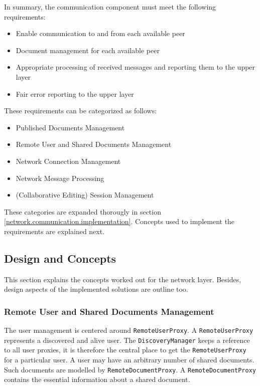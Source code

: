 In summary, the communication component must meet the following requirements:

\begin{itemize}
 \item Enable communication to and from each available peer
 \item Document management for each available peer
 \item Appropriate processing of received messages and reporting them to the upper layer
 \item Fair error reporting to the upper layer
\end{itemize}

These requirements can be categorized as follows:

\begin{itemize}
 \item Published Documents Management
 \item Remote User and Shared Documents Management
 \item Network Connection Management
 \item Network Message Processing
 \item (Collaborative Editing) Session Management
\end{itemize}

These categories are expanded thorougly in section \ref{network.communication.implementation}. Concepts used to implement the requirements are explained next.

\subsection{Design and Concepts}
This section explains the concepts worked out for the network layer. Besides, design aspects of the implemented solutions are outline too.

\subsubsection{Remote User and Shared Documents Management}
The user management is centered around \texttt{RemoteUserProxy}. A  \texttt{Remote\-User\-Proxy} represents a discovered and alive user. The  \texttt{DiscoveryManager} keeps a reference to all user proxies, it is therefore the central place to get the  \texttt{RemoteUserProxy} for a particular user. A user may have an arbitrary number of shared documents. Such documents are modelled by  \texttt{RemoteDocumentProxy}. A  \texttt{RemoteDocumentProxy} contains the essential information about a shared document.

